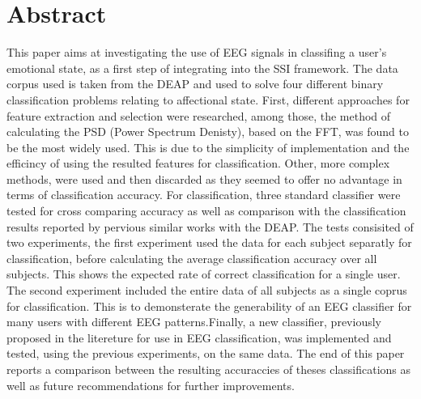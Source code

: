 \documentclass[12pt, a4paper, fleqn]{memoir}%
\begin{document}
\chapter*{Abstract}
This paper aims at investigating the use of EEG signals in classifing a user's emotional state, as a first step of integrating into the SSI framework. The data corpus used is taken from the DEAP and used to solve four different binary classification problems relating to affectional state. First, different approaches for feature extraction and selection were researched, among those, the method of calculating the PSD (Power Spectrum Denisty), based on the FFT,  was found to be the most widely used. This is due to the simplicity of implementation and the efficincy of using the resulted features for classification. Other, more complex methods, were used and then discarded as they seemed to offer no advantage in terms of classification accuracy. For classification, three standard classifier were tested for cross comparing accuracy as well as comparison with the classification results reported by pervious similar works with the DEAP. The tests consisited of two experiments, the first experiment used the data for each subject separatly for classification, before calculating the average classification accuracy over all subjects. This shows the expected rate of correct classification for a single user. The second experiment included the entire data of all subjects as a single coprus for classification. This is to demonsterate the generability of an EEG classifier for many users with different EEG patterns.Finally, a new classifier, previously proposed in the litereture for use in EEG classification, was implemented and tested, using the previous experiments, on the same data. The end of this paper reports a comparison between the resulting accuraccies of theses classifications as well as future recommendations for further improvements. 

\end{document}
